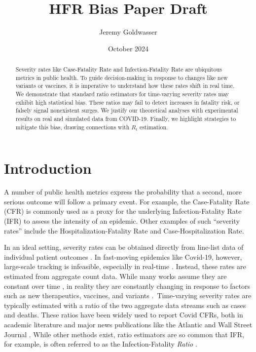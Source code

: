 \documentclass{article}
\title{HFR Bias Paper Draft}
\author{Jeremy Goldwasser}
\date{October 2024}
\begin{document}
\maketitle
\begin{abstract}
    Severity rates like Case-Fatality Rate and Infection-Fatality Rate are ubiquitous metrics in public health. To guide decision-making in response to changes like new variants or vaccines, it is imperative to understand how these rates shift in real time. We demonstrate that standard ratio estimators for time-varying severity rates may exhibit high statistical bias. These ratios may fail to detect increases in fatality risk, or falsely signal nonexistent surges. We justify our theoretical analyses with experimental results on real and simulated data from COVID-19. Finally, we highlight strategies to mitigate this bias, drawing connections with $R_t$ estimation.
\end{abstract}
\section{Introduction}

A number of public health metrics express the probability that a second, more serious outcome will follow a primary event. For example, the Case-Fatality Rate (CFR) is commonly used as a proxy for the underlying Infection-Fatality Rate (IFR) to assess the intensity of an epidemic. Other examples of such “severity rates” include the Hospitalization-Fatality Rate and Case-Hospitalization Rate. 

In an ideal setting, severity rates can be obtained directly from line-list data of individual patient outcomes \cite{HFR_line_list1,HFR_linelist2,HFR_linelist3,cfr_line_list}. In fast-moving epidemics like Covid-19, however, large-scale tracking is infeasible, especially in real-time \cite{UKpaper}. Instead, these rates are estimated from aggregate count data. While many works assume they are constant over time \cite{reich2012estimating,ghani,jewell2007nonparametric,lancet_controversial}, in reality they are constantly changing in response to factors such as new therapeutics, vaccines, and variants \cite{nyt}. Time-varying severity rates are typically estimated with a ratio of the two aggregate data streams such as cases and deaths. These ratios have been widely used to report Covid CFRs, both in academic literature \cite{germany,horita2022global,timevar_ifr,yuan2020monitoring,LIU2023100350} and major news publications like the Atlantic \cite{atlantic} and Wall Street Journal \cite{wsj}. While other methods exist, ratio estimators are so common that IFR, for example, is often referred to as the Infection-Fatality \textit{Ratio} \cite{timevar_ifr, lancet_ifr}.
\end{document}
